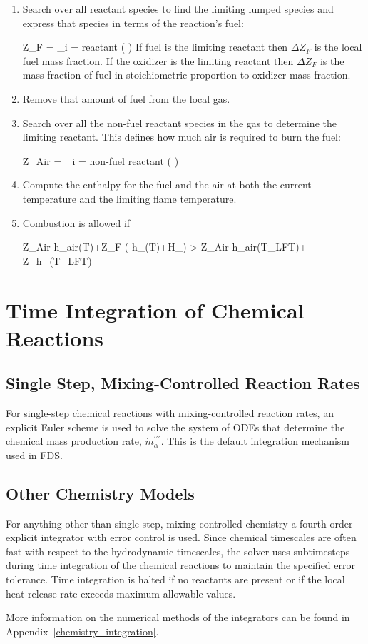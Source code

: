 \begin{enumerate}
\item Search over all reactant species to find the limiting lumped species and express that species in terms of the reaction's fuel:

\be \Delta Z_F = \min_{i \; = \; reactant} \left( \right) \ee
If fuel is the limiting reactant then $\Delta Z_F$ is the local fuel mass fraction. If the oxidizer is the limiting reactant then $\Delta Z_F$ is the mass fraction of fuel in stoichiometric proportion to oxidizer mass fraction.
\item Remove that amount of fuel from the local gas.
\item Search over all the non-fuel reactant species in the gas to determine the limiting reactant.  This defines how much air is required to burn the fuel:

\be \Delta Z_{Air} = \min_{i \; = \; non-fuel \; reactant} \left( \right) \ee

\item Compute the enthalpy for the fuel and the air at both the current temperature and the limiting flame temperature.
\item Combustion is allowed if 

\be \Delta Z_{Air} h_{air}(T)+\Delta Z_F \left( h_\F(T)+\Delta H_\F \right) > \Delta Z_{Air} h_{air}(T_{LFT})+ \Delta Z_\F h_\F(T_{LFT}) \ee

\end{enumerate}

\section{Time Integration of Chemical Reactions}

\subsection{Single Step, Mixing-Controlled Reaction Rates}
For single-step chemical reactions with mixing-controlled reaction rates, an explicit Euler scheme is used to solve the system of ODEs that determine the chemical mass production rate, $\dot{m}^{\prime\prime\prime}_{\alpha}$. This is the default integration mechanism used in FDS.

\subsection{Other Chemistry Models}

For anything other than single step, mixing controlled chemistry a fourth-order explicit integrator with error control is used.  Since chemical timescales are often fast with respect to the hydrodynamic timescales, the solver uses subtimesteps during time integration of the chemical reactions to maintain the specified error tolerance.  Time integration is halted if no reactants are present or if the local heat release rate exceeds maximum allowable values.

More information on the numerical methods of the integrators can be found in Appendix~\ref{chemistry_integration}.

